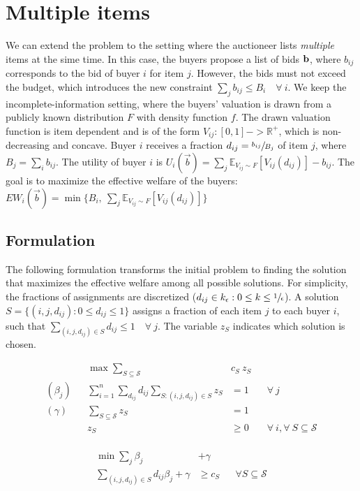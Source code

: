 \section{Multiple items}


We can extend the problem to the setting where the auctioneer lists \emph{multiple} items at the sime time. In this case, the buyers propose a list of bids $\mathbf{b}$, where $b_{ij}$ corresponds to the bid of buyer $i$ for item $j$. However, the bids must not exceed the budget, which introduces the new constraint $\sum_{j} b_{ij} \le B_i \quad \forall\ i$. We keep the incomplete-information setting, where the buyers' valuation is drawn from a publicly known distribution $F$ with density function $f$. The drawn valuation function is item dependent and is of the form $V_{ij} : [0,1] -> \mathbb{R}^+$, which is non-decreasing and concave. Buyer $i$ receives a fraction $d_{ij} = \sfrac{b_{ij}}{B_j}$ of item $j$, where $B_j = \sum_i b_{ij}$. The utility of buyer $i$ is $U_i(\vec{b}) = \sum_{j} \mathbb{E}_{V_{ij} \sim F}[V_{ij}(d_{ij})] - b_{ij}$. The goal is to maximize the effective welfare of the buyers: $EW_i(\vec{b}) = \min\{B_i,\  \sum_{j} \mathbb{E}_{V_{ij} \sim F}[V_{ij}(d_{ij})]\}$

\subsection{Formulation}

The following formulation transforms the initial problem to finding the solution that maximizes the effective welfare among all possible solutions. For simplicity, the fractions of assignments are discretized ($d_{ij} \in k_{\epsilon} : 0 \le k \le \sfrac{1}{\epsilon}$). A solution $S = \{(i, j, d_{ij}) : 0 \le d_{ij} \le 1\}$ assigns a fraction of each item $j$ to each buyer $i$, such that $\sum_{(i,j,d_{ij}) \in S} d_{ij} \le 1 \quad \forall\ j$. The variable $z_S$ indicates which solution is chosen.

\begin{minipage}[t]{0.59\textwidth}
	\begin{align*}
		&& \max  \sum_{S \subseteq \mathcal{S}} &c_{S}\ z_{S} \\
		(\beta_j) && \sum_{i=1}^{n} \sum_{d_{ij}} d_{ij} \sum_{S: (i,j,d_{ij}) \in S } z_{S} &= 1 & & \forall \ j\\
		(\gamma) && \sum_{S \subseteq \mathcal{S}} z_{S}  &= 1	& & \\
		&& z_{S} &\geq 0 & & \forall\ i, \forall\ S \subseteq \mathcal{S}\\
	\end{align*}
\end{minipage}
\begin{minipage}[t]{0.3\textwidth}
	\begin{align*}
		\min \sum_{j} \beta_j &+ \gamma \\
		\sum_{(i,j,d_{ij}) \in S} d_{ij} \beta_j + \gamma &\geq c_{S}  & & \forall S \subseteq \mathcal{S}\\
\end{align*}
\end{minipage}

